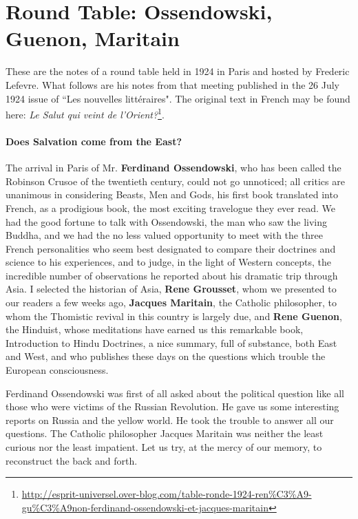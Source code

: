 \section{Round Table: Ossendowski, Guenon, Maritain}

These are the notes of a round table held in 1924 in Paris and hosted by Frederic Lefevre. What follows are his notes from that meeting published in the 26 July 1924 issue of ``Les nouvelles littéraires". The original text in French may be found here: \textit{Le Salut qui veint de l'Orient?}\footnote{\url{http://esprit-universel.over-blog.com/table-ronde-1924-ren\%C3\%A9-gu\%C3\%A9non-ferdinand-ossendowski-et-jacques-maritain}}. 

\paragraph{Does Salvation come from the East?}
The arrival in Paris of Mr. \textbf{Ferdinand Ossendowski}, who has been called the Robinson Crusoe of the twentieth century, could not go unnoticed; all critics are unanimous in considering Beasts, Men and Gods, his first book translated into French, as a prodigious book, the most exciting travelogue they ever read. We had the good fortune to talk with Ossendowski, the man who saw the living Buddha, and we had the no less valued opportunity to meet with the three French personalities who seem best designated to compare their doctrines and science to his experiences, and to judge, in the light of Western concepts, the incredible number of observations he reported about his dramatic trip through Asia. I selected the historian of Asia, \textbf{Rene Grousset}, whom we presented to our readers a few weeks ago, \textbf{Jacques Maritain}, the Catholic philosopher, to whom the Thomistic revival in this country is largely due, and \textbf{Rene Guenon}, the Hinduist, whose meditations have earned us this remarkable book, Introduction to Hindu Doctrines, a nice summary, full of substance, both East and West, and who publishes these days on the questions which trouble the European consciousness.

Ferdinand Ossendowski was first of all asked about the political question like all those who were victims of the Russian Revolution. He gave us some interesting reports on Russia and the yellow world. He took the trouble to answer all our questions. The Catholic philosopher Jacques Maritain was neither the least curious nor the least impatient. Let us try, at the mercy of our memory, to reconstruct the back and forth.

